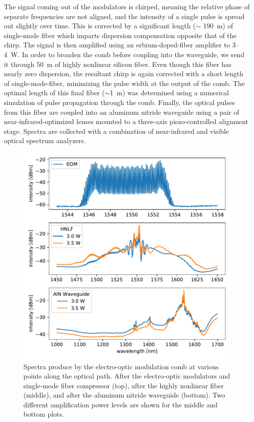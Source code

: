 The signal coming out of the modulators is chirped, meaning the relative phase of separate frequencies are not aligned, and the intensity of a single pulse is spread out slightly over time. This is corrected by a significant length ($\sim$ 190~\si{\meter}) of single-mode fiber which imparts dispersion compensation opposite that of the chirp. The signal is then amplified using an erbium-doped-fiber amplifier to 3--4~\si{\watt}. In order to broaden the comb before coupling into the waveguide, we send it through 50~\si{\meter} of highly nonlinear silicon fiber. Even though this fiber has nearly zero dispersion, the resultant chirp is again corrected with a short length of single-mode-fiber, minimizing the pulse width at the output of the comb. The optimal length of this final fiber ($\sim$1~\si{\meter}) was determined using a numerical simulation of pulse propagation through the comb. Finally, the optical pulses from this fiber are coupled into an aluminum nitride waveguide using a pair of near-infrared-optimized lenses mounted to a three-axis piezo-controlled alignment stage. Spectra are collected with a combination of near-infrared and visible optical spectrum analyzers.

\begin{figure}
    \centering
    \includegraphics[width=\textwidth]{figures-3/eom-spectra.pdf}
    \caption[Electro-optic modulation comb spectra]{Spectra produce by the electro-optic modulation comb at various points along the optical path. After the electro-optic modulators and single-mode fiber compressor (top), after the highly nonlinear fiber (middle), and after the aluminum nitride waveguide (bottom). Two different amplification power levels are shown for the middle and bottom plots.}
    \label{fig:eom-spectra}
\end{figure}

